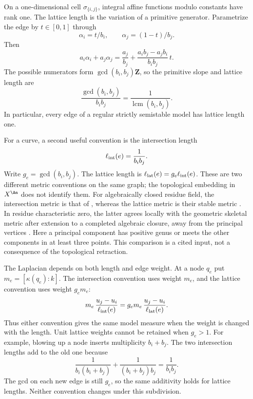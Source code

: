 \begin{remark}
\label{rem:lattice-length}
On a one-dimensional cell $\sigma_{\{i,j\}}$, integral affine
functions modulo constants have rank one.  The lattice length is
the variation of a primitive generator.  Parametrize the edge by
$t\in[0,1]$ through
\[
                 \alpha_i=t/b_i,\qquad
                 \alpha_j=(1-t)/b_j.
\]
Then
\[
 a_i\alpha_i+a_j\alpha_j
     =\frac{a_j}{b_j}
       +\frac{a_i b_j-a_j b_i}{b_i b_j}\,t .
\]
The possible numerators form $\gcd(b_i,b_j)\mathbf Z$, so the
primitive slope and lattice length are
\[
          \frac{\gcd(b_i,b_j)}{b_i b_j}
                  =\frac1{\operatorname{lcm}(b_i,b_j)}.
\]
In particular, every edge of a regular strictly semistable model
has lattice length one.

For a curve, a second useful convention is the intersection length
\[
                     \ell_{\rm int}(e)=\frac1{b_i b_j}.
\]
Write $g_e=\gcd(b_i,b_j)$.  The lattice length is
$\ell_{\rm lat}(e)=g_e\ell_{\rm int}(e)$.
These are two different metric conventions on the same graph;
the topological embedding in $X^{\An}$ does not identify them.
For algebraically closed residue field, the intersection metric
is that of \cite[(2.1.3), Theorem~2.3.3]{BN16Weight}, whereas the
lattice metric is their stable metric
\cite[Appendix~A.1.2--A.1.4]{BN16Weight}.
In residue characteristic zero, the latter agrees locally with
the geometric skeletal metric after extension to a completed
algebraic closure, away from the principal vertices
\cite[Proposition~A.2.3]{BN16Weight}.  Here a principal component
has positive genus or meets the other components in at least
three points.  This comparison is a cited input, not a consequence
of the topological retraction.

The Laplacian depends on both length and edge weight.  At a node
$q_e$ put $m_e=[\kappa(q_e):k]$.  The intersection convention uses
weight $m_e$, and the lattice convention uses weight $g_e m_e$:
\begin{equation}
\label{eq:ch05-length-weight-conversion}
 m_e\,\frac{u_j-u_i}{\ell_{\rm int}(e)}
       =g_e m_e\,\frac{u_j-u_i}{\ell_{\rm lat}(e)}.
\end{equation}
Thus either convention gives the same model measure when the
weight is changed with the length.  Unit lattice weights cannot
be retained when $g_e>1$.
For example, blowing up a node inserts multiplicity $b_i+b_j$.
The two intersection lengths add to the old one because
\[
 \frac1{b_i(b_i+b_j)}+\frac1{(b_i+b_j)b_j}
                            =\frac1{b_i b_j}.
\]
The gcd on each new edge is still $g_e$, so the same additivity
holds for lattice lengths.  Neither convention changes under
this subdivision.


\end{remark}
